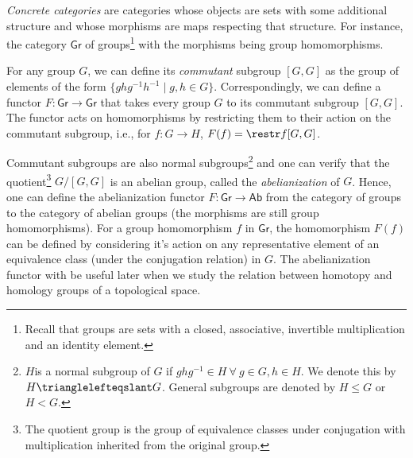 \emph{Concrete categories} are categories whose objects are sets
with some additional structure and whose morphisms are maps respecting
that structure. For instance, the category $\mathsf{Gr}$ of groups\footnote{Recall that groups are sets with a closed, associative, invertible
multiplication and an identity element.} with the morphisms being group homomorphisms.
\begin{example}
    For any group $G$, we can define its \emph{commutant} subgroup
    $[G,G]$ as the group of elements of the form $\{ghg^{-1}h^{-1}\mid g,h\in G\}$.
    Correspondingly, we can define a functor $F:\mathsf{Gr}\rightarrow\mathsf{Gr}$
    that takes every group $G$ to its commutant subgroup $[G,G]$. The
    functor acts on homomorphisms by restricting them to their action
    on the commutant subgroup, i.e., for $f:G\rightarrow H$, $F(f)=\restr f{[G,G]}$.

    Commutant subgroups are also normal subgroups\footnote{$H$is a normal subgroup of $G$ if $ghg^{-1}\in H~\forall~g\in G,h\in H$. We denote this by $H \trianglelefteqslant G$. General subgroups are denoted by $H\leq G$ or $H<G$.}
    and one can verify that the quotient\footnote{The quotient group is the group of equivalence classes under conjugation
    with multiplication inherited from the original group.} $G/[G,G]$ is an abelian group, called the \emph{abelianization}
    of $G$. Hence, one can define the abelianization functor
    $F:\mathsf{Gr}\rightarrow\mathsf{Ab}$ from the category of groups
    to the category of abelian groups (the morphisms are still group homomorphisms).
    For a group homomorphism $f$ in $\mathsf{Gr}$, the homomorphism
    $F(f)$ can be defined by considering it's action on any representative
    element of an equivalence class (under the conjugation relation) in
    $G$. The abelianization functor with be useful later when we study
    the relation between homotopy and homology groups of a topological
    space.
\end{example}
%
